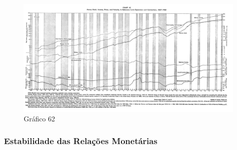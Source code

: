 \documentclass[12pt]{article}
\begin{document}
\begin{figure}[H]
    \centering
    \caption{Gráfico 62}
    \includegraphics[width=1.0\textwidth]{4º Período/História do Pensamento Econômico/Tradução HPE/Tradução Tópico 9.1/Gráfico 62.png}
    \end{figure}
    
\subsubsection{\textbf{Estabilidade das Relações Monetárias}}
\end{document}
